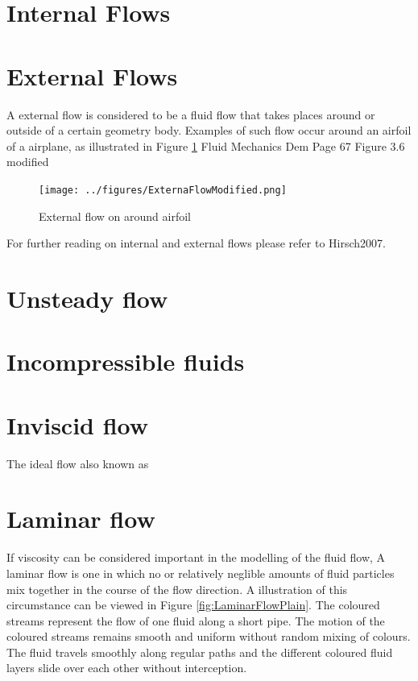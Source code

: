 \section{Internal Flows}

\section{External Flows}
A external flow is considered to be a fluid flow that takes places around or outside of a certain geometry body. Examples of such flow occur around
an airfoil of a airplane, as illustrated in Figure \ref{fig:ExternalFlowAirfoil}  Fluid Mechanics Dem Page 67 Figure 3.6 modified


\begin{figure}[htp]
\centering
\texttt{[image: ../figures/ExternaFlowModified.png]}
\caption{External flow on around airfoil}
\label{fig:ExternalFlowAirfoil}
\end{figure}

For further reading on internal and external flows please refer to Hirsch2007.

\section{Unsteady flow}


\section{Incompressible fluids}
\label{sec:incompress_fluid}



\section{Inviscid flow}
\label{sec:invisicid_flow}
The ideal flow also known as



\section{Laminar flow}

If viscosity can be considered important in the modelling of the fluid flow, 
A laminar flow is one in which no or relatively neglible amounts of fluid particles mix together in the course of the flow direction. A illustration
of this circumstance can be viewed in Figure \ref{fig:LaminarFlowPlain}. The coloured streams represent the flow of one fluid along a short pipe. The motion
of the coloured streams remains smooth and uniform without random mixing of colours. The fluid travels smoothly along regular paths and the different coloured
fluid layers slide over each other without interception.


